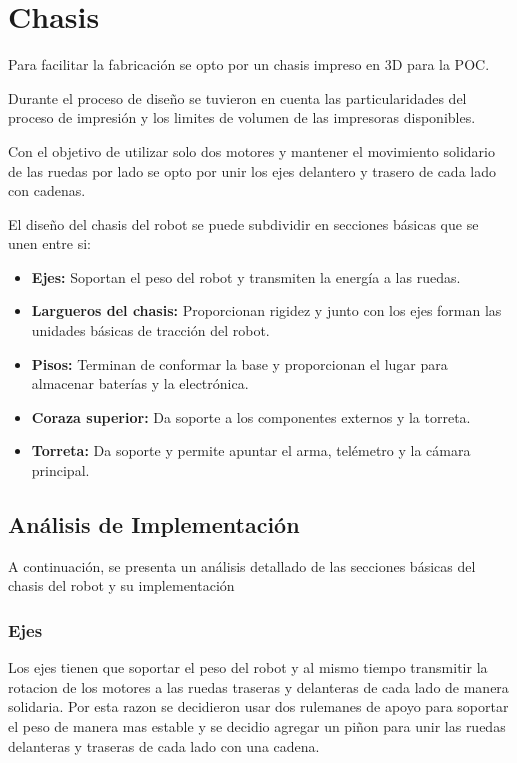 \section{Chasis}
Para facilitar la fabricación se opto por un chasis impreso en 3D para la POC.

Durante el proceso de diseño se tuvieron en cuenta las particularidades del proceso de impresión y los limites de volumen de las impresoras disponibles.

Con el objetivo de utilizar solo dos motores y mantener el movimiento solidario de las ruedas por lado se opto por unir los ejes delantero y trasero de cada lado con cadenas.

El diseño del chasis del robot se puede subdividir en secciones básicas que se unen entre si:

\begin{itemize}
    \item \textbf{Ejes:} Soportan el peso del robot y transmiten la energía a las ruedas.

    \item \textbf{Largueros del chasis:} Proporcionan rigidez y junto con los ejes forman las unidades básicas de tracción del robot.

    \item \textbf{Pisos:} Terminan de conformar la base y proporcionan el lugar para almacenar baterías y la electrónica.

    \item \textbf{Coraza superior:} Da soporte a los componentes externos y la torreta. 

    \item \textbf{Torreta:} Da soporte y permite apuntar el arma, telémetro y la cámara principal. 

\end{itemize}

\subsection{Análisis de Implementación}

A continuación, se presenta un análisis detallado de las secciones básicas del chasis del robot y su implementación


\subsubsection{Ejes}

Los ejes tienen que soportar el peso del robot y al mismo tiempo transmitir la rotacion de los motores a las ruedas traseras y delanteras de cada lado de manera solidaria. Por esta razon se decidieron usar dos rulemanes de apoyo para soportar el peso de manera mas estable y se decidio agregar un piñon para unir las ruedas delanteras y traseras de cada lado con una cadena.

